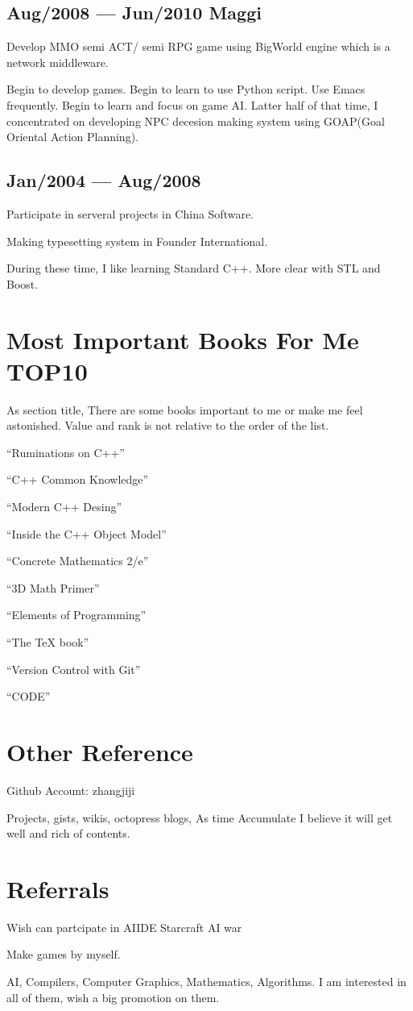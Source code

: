 \documentclass{article}
\begin{document}
\subsection*{Aug/2008 --- Jun/2010 \quad Maggi}

Develop MMO semi ACT/ semi RPG game using BigWorld engine which is a network middleware.

Begin to develop games. Begin to learn to use Python script. Use Emacs frequently. Begin to learn and focus on game AI. Latter half of that time, I concentrated on developing NPC decesion making system using GOAP(Goal Oriental Action Planning).

\subsection*{Jan/2004 --- Aug/2008}

Participate in serveral projects in China Software.

Making typesetting system in Founder International.

During these time, I like learning Standard C++. More clear with STL and Boost.

\section*{Most Important Books For Me TOP10}

As section title, There are some books important to me or make me feel astonished. Value and rank is not relative to the order of the list.

``Ruminations on C++''

``C++ Common Knowledge''

``Modern C++ Desing''

``Inside the C++ Object Model''

``Concrete Mathematics 2/e''

``3D Math Primer''

``Elements of Programming''

``The {\TeX} book''

``Version Control with Git''

``CODE''

\section{Other Reference}

Github Account: zhangjiji

Projects, gists, wikis, octopress blogs, As time Accumulate I believe it will get well and rich of contents.

\section{Referrals}

Wish can partcipate in AIIDE Starcraft AI war

Make games by myself.

AI, Compilers, Computer Graphics, Mathematics, Algorithms. I am interested in all of them, wish a big promotion on them.
\end{document}
